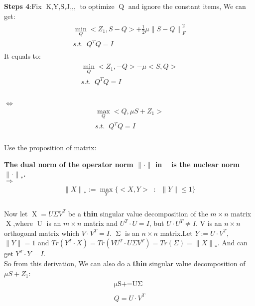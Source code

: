 \documentclass{article}
\begin{document}
\begin{flushleft}
\textbf{Steps 4}:\;\;Fix $\mathop{K,Y,S,J,Z_1,Z_2,Z_3}$ to optimize $\mathop{Q}$ and ignore the constant items, We can get:
\begin{eqnarray}
\begin{array}{l}
    \mathop{\min}\limits_{Q} <Z_1,S-Q> + \frac{1}{2}\mu {\parallel S - Q \parallel}_F^2  \\
    s.t. \;\; Q^TQ = I
\end{array}
\end{eqnarray}
It equals to:
\begin{eqnarray}
\begin{array}{lll}
    \mathop{\min}\limits_{Q} <Z_1,-Q> - \mu <S,Q>  \\
    s.t. \;\; Q^TQ = I \\
\end{array}
\end{eqnarray}\\
$\Longleftrightarrow$
\begin{eqnarray}
\begin{array}{lll}
    \mathop{\max}\limits_{Q} <Q,\mu S+Z_1>  \\
    s.t. \;\; Q^TQ = I
\end{array}
\end{eqnarray}\\
Use the proposition of matrix:
\end{flushleft}
\textbf{The dual norm of the operator norm $\parallel \cdot \parallel$ in $\mathop{R^{m\times n}}$ is the nuclear norm ${\parallel \cdot \parallel}_{\ast}$.}\\
$\Longrightarrow $
\begin{eqnarray}
\begin{array}{lll}
    {\parallel X\parallel}_{\ast} := \mathop{\max}\limits_{Y} \{ <X, Y> \;\; : \;\; \parallel Y\parallel \leq 1 \}
\end{array}
\end{eqnarray}\\
Now let $\mathop{X} = U\Sigma V^T $ be a \textbf{thin} singular value decomposition of the $m \times n$ matrix $\mathop{X}$,where $\mathop{U}$ is an $m \times n$ matrix and $U^T \cdot U=I$, but $U \cdot U^T \neq I$. V is an $n \times n$ orthogonal matrix which $V \cdot V^T=I$.\; $\mathop{\Sigma}$ is an $n\times n$ matrix.Let $Y :=U\cdot V^T $,$\parallel Y \parallel = 1$ and $Tr(Y^T \cdot X) = Tr(VU^T \cdot U\Sigma V^T)=Tr(\Sigma)={\parallel X\parallel}_{\ast}$. And can get $Y^T\cdot Y=I$.\\
So from this derivation, We can also do a \textbf{thin} singular value decomposition of $\mu S+Z_1 $:\\
\begin{eqnarray}
\begin{array}{lll}
\mathop{\mu S+Z_1 = U \Sigma V^T} \nonumber \\\\
Q = U\cdot V^T
\end{array}
\end{eqnarray}
\end{document}
